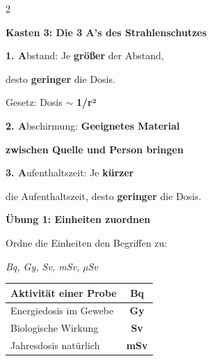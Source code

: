 \documentclass[10pt, a4paper]{article}
\newcommand{\fachfarbe}{physik}
\newcommand{\lsg}[1]{\textcolor{loesung}{\textbf{#1}}}
\newcommand{\abschnitt}[1]{%
    \vspace{8pt}\noindent\textbf{\textcolor{\fachfarbe}{#1}}\vspace{4pt}
}
\begin{document}
\begin{multicols}{2}
\vspace{6pt}


\abschnitt{Kasten 3: Die 3 A's des Strahlenschutzes}

\begin{merksatz}[Schutzmaßnahmen]
\textbf{1. A}bstand: Je \lsg{größer} der Abstand,

desto \lsg{geringer} die Dosis.

Gesetz: Dosis $\sim$ \lsg{1/r²}

\vspace{6pt}

\textbf{2. A}bschirmung: \lsg{Geeignetes Material}

\lsg{zwischen Quelle und Person bringen}

\vspace{6pt}

\textbf{3. A}ufenthaltszeit: Je \lsg{kürzer}

die Aufenthaltszeit, desto \lsg{geringer} die Dosis.
\end{merksatz}

\columnbreak


\abschnitt{Übung 1: Einheiten zuordnen}

Ordne die Einheiten den Begriffen zu:

\vspace{4pt}
\textit{Bq, Gy, Sv, mSv, µSv}

\vspace{6pt}

\begin{tabular}{|p{3.5cm}|c|}
\hline
Aktivität einer Probe & \lsg{Bq} \\
\hline
Energiedosis im Gewebe & \lsg{Gy} \\
\hline
Biologische Wirkung & \lsg{Sv} \\
\hline
Jahresdosis natürlich & \lsg{mSv} \\
\hline
\end{tabular}

\vspace{8pt}



\end{multicols}
\end{document}
